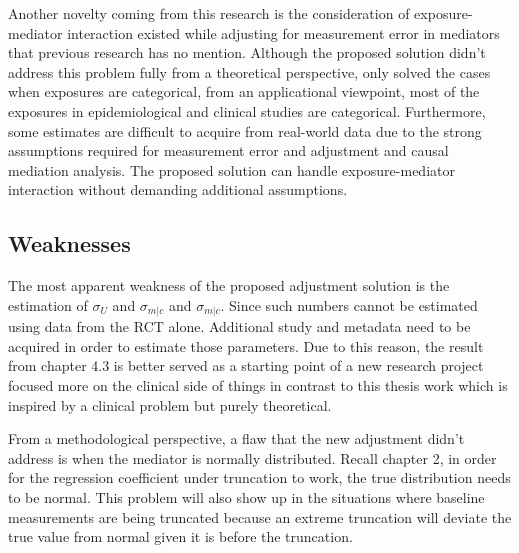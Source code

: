 \documentclass{article}
\begin{document}
Another novelty coming from this research is the consideration of exposure-mediator interaction existed while adjusting for measurement error in mediators that previous research has no mention. Although the proposed solution didn’t address this problem fully from a theoretical perspective, only solved the cases when exposures are categorical, from an applicational viewpoint, most of the exposures in epidemiological and clinical studies are categorical. Furthermore, some estimates are difficult to acquire from real-world data due to the strong assumptions required for measurement error and adjustment and causal mediation analysis. The proposed solution can handle exposure-mediator interaction without demanding additional assumptions. 


\subsection{Weaknesses}

The most apparent weakness of the proposed adjustment solution is the estimation of $\sigma_U$ and  $\sigma_{m | c}$ and $\sigma_{m|c}$. Since such numbers cannot be estimated using data from the RCT alone. Additional study and metadata need to be acquired in order to estimate those parameters. Due to this reason, the result from chapter 4.3 is better served as a starting point of a new research project focused more on the clinical side of things in contrast to this thesis work which is inspired by a clinical problem but purely theoretical. 

From a methodological perspective, a flaw that the new adjustment didn’t address is when the mediator is normally distributed. Recall chapter 2, in order for the regression coefficient under truncation to work, the true distribution needs to be normal. This problem will also show up in the situations where baseline measurements are being truncated because an extreme truncation will deviate the true value from normal given it is before the truncation. 








\typeout{} 
\end{document}
